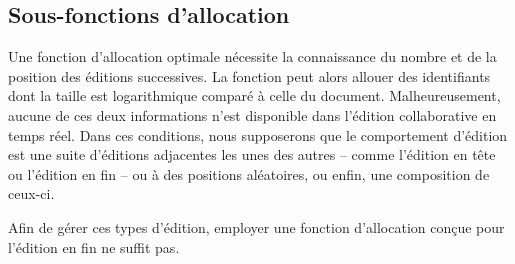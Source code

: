 

\subsection{Sous-fonctions d'allocation}
\label{repl:subsec:suballocation}

Une fonction d'allocation optimale nécessite la connaissance du nombre et de la
position des éditions successives. La fonction peut alors allouer des
identifiants dont la taille est logarithmique comparé à celle du
document. Malheureusement, aucune de ces deux informations n'est disponible dans
l'édition collaborative en temps réel. Dans ces conditions, nous supposerons que
le comportement d'édition est une suite d'éditions adjacentes les unes des
autres -- comme l'édition en tête ou l'édition en fin -- ou à des positions
aléatoires, ou enfin, une composition de ceux-ci.

Afin de gérer ces types d'édition, employer une fonction d'allocation conçue
pour l'édition en fin ne suffit pas. 

